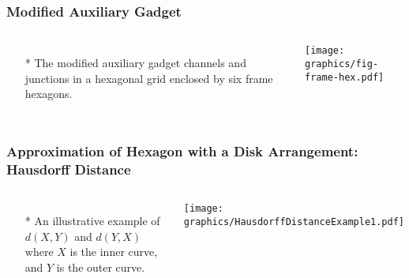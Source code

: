 \documentclass{beamer}
\begin{document}
\begin{frame} \frametitle{Modified Auxiliary Gadget}
    \begin{columns}[c]
        \begin{itemize}
            \item[*] The modified auxiliary gadget channels and junctions in a hexagonal grid enclosed by six frame hexagons.
        \end{itemize}
        \begin{minipage}{\linewidth}
            \begin{center}
            \texttt{[image: graphics/fig-frame-hex.pdf]}\label{gfx:fig-frame-hex.pdf}
            \end{center}
        \end{minipage}
    \end{columns}
\end{frame}
\begin{frame} \frametitle{Approximation of Hexagon with a Disk Arrangement: Hausdorff Distance}
    \begin{columns}[c]
            \begin{itemize}
            \item[*] An illustrative example of $d(X,Y)$ and $d(Y,X)$ where $X$ is the inner curve, and $Y$ is the outer curve.
            \end{itemize}  
        \begin{minipage}{\linewidth}
        \begin{center}
        \texttt{[image: graphics/HausdorffDistanceExample1.pdf]}
        \end{center}
        \end{minipage}
    \end{columns}
\end{frame}
\end{document}
